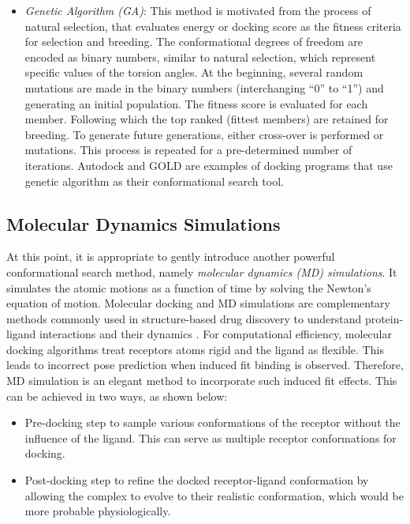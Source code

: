 \documentclass[10pt,letterpaper]{article}
\begin{document}
{{\begin{itemize}
    \item \textit{Genetic Algorithm (GA)}: This method\cite{bib20, bib21} is motivated from the process of natural selection, that evaluates energy or docking score as the fitness criteria for selection and breeding. The conformational degrees of freedom are encoded as binary numbers, similar to natural selection, which represent specific values of the torsion angles.  At the beginning, several random mutations are made in the binary numbers (interchanging “0” to “1”) and generating an initial population. The fitness score is evaluated for each member. Following which the top ranked (fittest members) are retained for breeding. To generate future generations, either cross-over is performed or mutations. This process is repeated for a pre-determined number of iterations. Autodock\cite{bib22} and GOLD\cite{bib20} are examples of docking programs that use genetic algorithm as their conformational search tool.
\end{itemize}   

\subsection*{Molecular Dynamics Simulations}
At this point, it is appropriate to gently introduce another powerful conformational search method, namely \textit{molecular dynamics (MD) simulations}. It simulates the atomic motions as a function of time by solving the Newton's equation of motion\cite{bib24}. 
Molecular docking and MD simulations are complementary methods commonly used in structure-based drug discovery to understand protein-ligand interactions and their dynamics \cite{bib25, bib26}.  For computational efficiency, molecular docking algorithms treat receptors atoms rigid and the ligand as flexible. This leads to incorrect pose prediction when induced fit binding is observed. Therefore, MD simulation is an elegant method to incorporate such induced fit effects. This can be achieved in two ways, as shown below:
\begin{itemize}
\item Pre-docking step to sample various conformations of the receptor without the influence of the ligand.  This can serve as multiple receptor conformations for docking. 
\item Post-docking step to refine the docked receptor-ligand conformation by allowing the complex to evolve to their realistic conformation, which would be more probable physiologically.
\end{itemize}

}}
\end{document}
